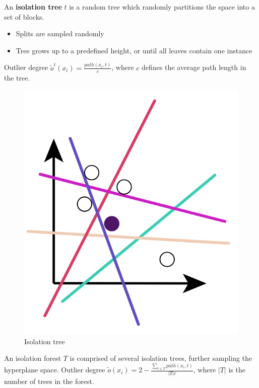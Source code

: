 \begin{paracol}{2}
   
   An \textbf{isolation tree} $t$ is a random tree which randomly
   partitions the space into a set of blocks.
   \begin{itemize}
      \item Splits are sampled randomly
      \item Tree grows up to a predefined height, or until all
      leaves contain one instance
   \end{itemize}
   Outlier degree \(\tilde{o}^t(x_i) = \frac{path(x_i,t)}{c} \), where $c$ defines the average path length in the tree.
   
   \switchcolumn

   \begin{figure}[htbp]
      \centering
      \includegraphics{images/06/isoltree.png}
      \caption{Isolation tree}
      \label{fig:06/isoltree}
   \end{figure}
\end{paracol}

An isolation forest $T$ is comprised of several isolation trees,
further sampling the hyperplane space.
Outlier degree \(\tilde{o}(x_i) = 2 - \frac{\sum_{t \in T} path(x_i,t)}{|T|c}\), where $|T|$ is the number of trees in the forest.

